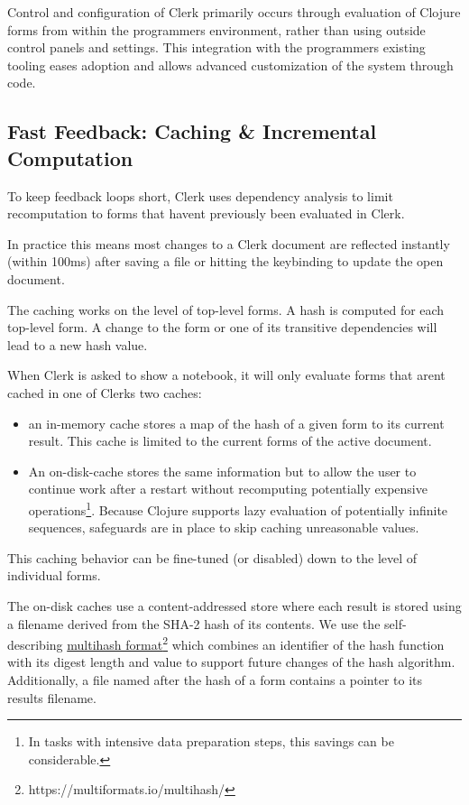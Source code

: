 \documentclass[sigconf,screen]{acmart}
\providecommand{\tightlist}{%
  \setlength{\itemsep}{0pt}\setlength{\parskip}{0pt}}
\begin{document}
Control and configuration of Clerk primarily occurs through evaluation of Clojure forms from within the programmer\textquotesingle s environment, rather than using outside control panels and settings. This integration with the programmer\textquotesingle s existing tooling eases adoption and allows advanced customization of the system through code.

\hypertarget{fast-feedback:-caching-ux5cux26-incremental-computation}{%
\subsection{Fast Feedback: Caching \& Incremental Computation}\label{fast-feedback:-caching-ux5cux26-incremental-computation}}

To keep feedback loops short, Clerk uses dependency analysis to limit recomputation to forms that haven\textquotesingle t previously been evaluated in Clerk.

In practice this means most changes to a Clerk document are reflected instantly (within 100ms) after saving a file or hitting the keybinding to update the open document.

The caching works on the level of top-level forms. A hash is computed for each top-level form. A change to the form or one of its transitive dependencies will lead to a new hash value.

When Clerk is asked to show a notebook, it will only evaluate forms that aren\textquotesingle t cached in one of Clerk\textquotesingle s two caches:

\begin{itemize}
\tightlist
\item
  an in-memory cache stores a map of the hash of a given form to its current result. This cache is limited to the current forms of the active document.
\item
  An on-disk-cache stores the same information but to allow the user to continue work after a restart without recomputing potentially expensive operations\footnote{In tasks with intensive data preparation steps, this savings can be considerable.}. Because Clojure supports lazy evaluation of potentially infinite sequences, safeguards are in place to skip caching unreasonable values.
\end{itemize}

This caching behavior can be fine-tuned (or disabled) down to the level of individual forms.

The on-disk caches use a content-addressed store where each result is stored using a filename derived from the SHA-2 hash of its contents. We use the self-describing {\href{https://multiformats.io/multihash/}{multihash format}\footnote{https://multiformats.io/multihash/}} which combines an identifier of the hash function with its digest length and value to support future changes of the hash algorithm. Additionally, a file named after the hash of a form contains a pointer to its results filename.
\end{document}

